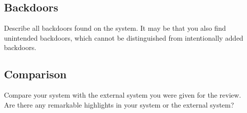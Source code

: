 \documentclass{article}
\begin{document}
\subsection{Backdoors}

Describe all backdoors found on the system. 
It may be that you also find unintended backdoors, which cannot be distinguished from intentionally added backdoors.



\subsection{Comparison}

Compare your system with the external system you were given for the
review.   Are there any remarkable highlights in your system or the external system?
\end{document}
